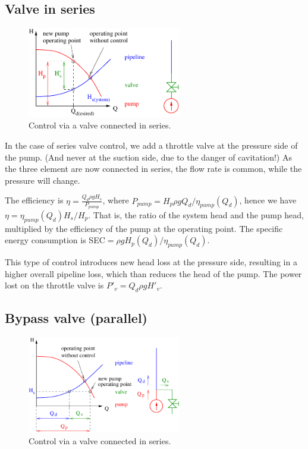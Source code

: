 \clearpage

\subsection{Valve in series}


\begin{figure}
\includegraphics[width=0.6\textwidth]{figs/series_connection.pdf}
\caption{Control via a valve connected in series.}
\end{figure}

In the case of series valve control, we add a throttle valve at the pressure side of the pump. (And never at the suction side, due to the danger of cavitation!) As the three element are now connected in series, the flow rate is common, while the pressure will change. 

The efficiency is $\eta=\frac{Q_d \rho g H_s}{P_{pump}}$, where $P_{pump}=H_p\rho g Q_d /\eta_{pump}(Q_d)$, hence we have $\eta=\eta_{pump}(Q_d)H_s/H_p$. That is, the ratio of the system head and the pump head, multiplied by the efficiency of the pump at the operating point. The specific energy consumption is SEC$=\rho g H_p(Q_d)/\eta_{pump}(Q_d)$. 

This type of control introduces new head loss at the pressure side, resulting in a higher overall pipeline loss, which than reduces the head of the pump. The power lost on the throttle valve is $P'_v=Q_d \rho g H'_v$.

\subsection{Bypass valve (parallel)}


\begin{figure}
\includegraphics[width=0.6\textwidth]{figs/parallel_connection.pdf}
\caption{Control via a valve connected in series.}
\end{figure}

